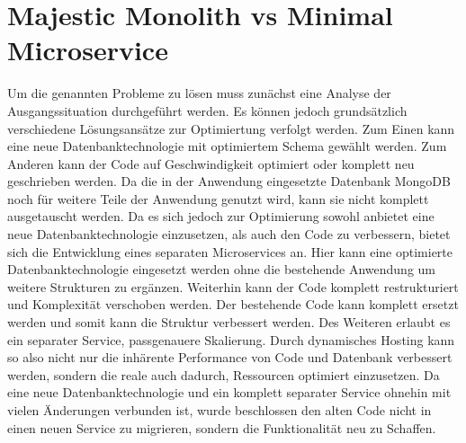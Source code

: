 \section{Majestic Monolith vs Minimal Microservice}
Um die genannten Probleme zu lösen muss zunächst eine Analyse der Ausgangssituation durchgeführt werden. Es können jedoch grundsätzlich verschiedene Lösungsansätze zur Optimiertung verfolgt werden. Zum Einen kann eine neue Datenbanktechnologie mit optimiertem Schema gewählt werden. Zum Anderen kann der Code auf Geschwindigkeit optimiert oder komplett neu geschrieben werden.
Da die in der Anwendung eingesetzte Datenbank MongoDB noch für weitere Teile der Anwendung genutzt wird, kann sie nicht komplett ausgetauscht werden. Da es sich jedoch zur Optimierung sowohl anbietet eine neue Datenbanktechnologie einzusetzen, als auch den Code zu verbessern, bietet sich die Entwicklung eines separaten Microservices an. Hier kann eine optimierte Datenbanktechnologie eingesetzt werden ohne die bestehende Anwendung um weitere Strukturen zu ergänzen. Weiterhin kann der Code komplett restrukturiert und Komplexität verschoben werden. Der bestehende Code kann komplett ersetzt werden und somit kann die Struktur verbessert werden.
Des Weiteren erlaubt es ein separater Service, passgenauere Skalierung. Durch dynamisches Hosting kann so also nicht nur die inhärente Performance von Code und Datenbank verbessert werden, sondern die reale auch dadurch, Ressourcen optimiert einzusetzen.
Da eine neue Datenbanktechnologie und ein komplett separater Service ohnehin mit vielen Änderungen verbunden ist, wurde beschlossen den alten Code nicht in einen neuen Service zu migrieren, sondern die Funktionalität neu zu Schaffen.

